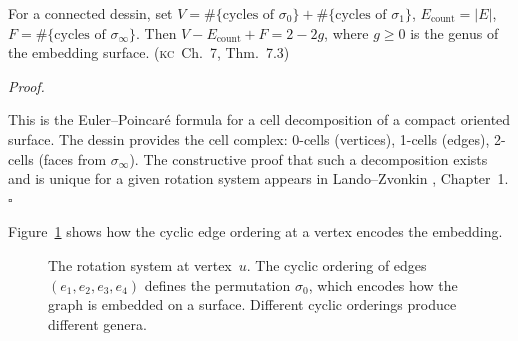 \documentclass[11pt, a4paper, openany]{book}
\newcommand{\KC}[1]{\textnormal{(\textsc{kc}~#1)}}
\newcounter{thm}[chapter]
\renewenvironment{proof}[1][Proof]{%
  \par\noindent\textit{#1.}\quad
}{\hfill$\square$\par\medskip}
\begin{document}
\begin{theorem}\label{thm:euler-grothendieck}
For a connected dessin, set $V = \#\{\text{cycles of } \sigma_0\} + \#\{\text{cycles of } \sigma_1\}$, $E_{\mathrm{count}} = |E|$, $F = \#\{\text{cycles of } \sigma_\infty\}$. Then $V - E_{\mathrm{count}} + F = 2 - 2g$, where $g \ge 0$ is the genus of the embedding surface. \KC{Ch.~7, Thm.~7.3}
\end{theorem}

\begin{proof}
This is the Euler--Poincar\'e formula for a cell decomposition of a compact oriented surface. The dessin provides the cell complex: 0-cells (vertices), 1-cells (edges), 2-cells (faces from $\sigma_\infty$). The constructive proof that such a decomposition exists and is unique for a given rotation system appears in Lando--Zvonkin \cite{lando2004}, Chapter~1.
\end{proof}

\noindent
Figure~\ref{fig:rotation-system} shows how the cyclic edge ordering at a
vertex encodes the embedding.

\begin{figure}[ht]
\centering
{}
\caption{The rotation system at vertex~$u$.  The cyclic ordering of edges
$(e_1, e_2, e_3, e_4)$ defines the permutation $\sigma_0$, which encodes
how the graph is embedded on a surface.  Different cyclic orderings
produce different genera.}
\label{fig:rotation-system}
\end{figure}
\end{document}
